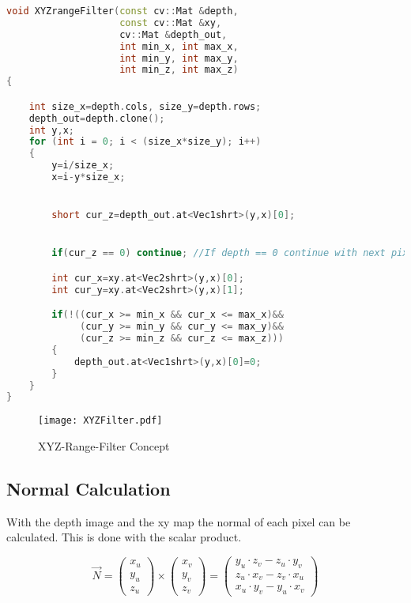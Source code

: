 \begin{lstlisting}[caption={XYZrangeFilter - Function\label{lst:range3d}},language=C++]
void XYZrangeFilter(const cv::Mat &depth, 
                    const cv::Mat &xy, 
                    cv::Mat &depth_out, 
                    int min_x, int max_x, 
                    int min_y, int max_y, 
                    int min_z, int max_z)
{

	int size_x=depth.cols, size_y=depth.rows;
	depth_out=depth.clone();
	int y,x;
	for (int i = 0; i < (size_x*size_y); i++)
	{
		y=i/size_x;
		x=i-y*size_x;


		short cur_z=depth_out.at<Vec1shrt>(y,x)[0];


		if(cur_z == 0) continue; //If depth == 0 continue with next pixel

		int cur_x=xy.at<Vec2shrt>(y,x)[0];
		int cur_y=xy.at<Vec2shrt>(y,x)[1];

		if(!((cur_x >= min_x && cur_x <= max_x)&&
		     (cur_y >= min_y && cur_y <= max_y)&&
		     (cur_z >= min_z && cur_z <= max_z)))
		{
			depth_out.at<Vec1shrt>(y,x)[0]=0;
		}
	}
}
\end{lstlisting}


\begin{figure}[htp]
\begin{center}
  \texttt{[image: XYZFilter.pdf]}
  \caption{XYZ-Range-Filter Concept}
  \label{figure:xyzrange}
\end{center}
\end{figure}


\subsection{Normal Calculation}
With the depth image and the xy map the normal of each pixel can be calculated. This is done with the scalar product.


$$ \vec{N} = \left( \begin{array}{c} x_u \\ y_u \\ z_u \end{array} \right) \times \left( \begin{array}{c} x_v \\ y_v \\ z_v \end{array} \right) 
= \left( \begin{array}{c} y_u \cdot z_v - z_u \cdot y_v \\ z_u \cdot x_v - z_v \cdot x_u \\ x_u \cdot y_v - y_u \cdot x_v \end{array}\right)
$$

